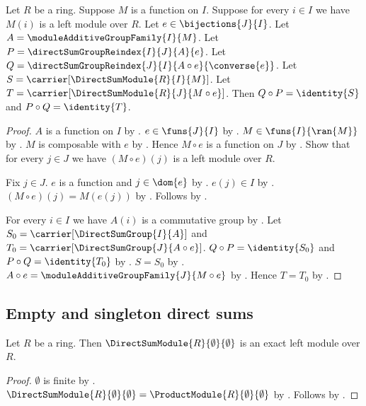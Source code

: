 \begin{theorem}\label{bijective_direct_sum_module_reindex_inverse}
    Let $R$ be a ring.
    Suppose $M$ is a function on $I$.
    Suppose for every $i\in I$ we have $M(i)$ is a left module over $R$.
    Let $e\in\bijections{J}{I}$.
    Let $A=\moduleAdditiveGroupFamily{I}{M}$.
    Let $P=\directSumGroupReindex{I}{J}{A}{e}$.
    Let $Q=\directSumGroupReindex{J}{I}{A\circ e}{\converse{e}}$.
    Let $S=\carrier[\DirectSumModule{R}{I}{M}]$.
    Let $T=\carrier[\DirectSumModule{R}{J}{M\circ e}]$.
    Then $Q\circ P=\identity{S}$ and $P\circ Q=\identity{T}$.
\end{theorem}
\begin{proof}
    $A$ is a function on $I$ by
        .
    $e\in\funs{J}{I}$ by .
    $M\in\funs{I}{\ran{M}}$ by
        .
    $M$ is composable with $e$ by .
    Hence $M\circ e$ is a function on $J$ by
        .
    Show that for every $j\in J$ we have
        $(M\circ e)(j)$ is a left module over $R$.
    \begin{subproof}
        Fix $j\in J$.
        $e$ is a function and $j\in\dom{e}$ by
            .
        $e(j)\in I$ by .
        $(M\circ e)(j)=M(e(j))$ by
            .
        Follows by \auto.
    \end{subproof}
    For every $i\in I$ we have $A(i)$ is a commutative group by
        .
    Let $S_0=\carrier[\DirectSumGroup{I}{A}]$ and
        $T_0=\carrier[\DirectSumGroup{J}{A\circ e}]$.
    $Q\circ P=\identity{S_0}$ and $P\circ Q=\identity{T_0}$ by
        .
    $S=S_0$ by .
    $A\circ e=\moduleAdditiveGroupFamily{J}{M\circ e}$ by
        .
    Hence $T=T_0$ by .
\end{proof}

\subsection{Empty and singleton direct sums}

\begin{proposition}\label{empty_direct_sum_module_is_exact}
    Let $R$ be a ring.
    Then $\DirectSumModule{R}{\emptyset}{\emptyset}$
        is an exact left module over $R$.
\end{proposition}
\begin{proof}
    $\emptyset$ is finite by .
    $\DirectSumModule{R}{\emptyset}{\emptyset}
        =\ProductModule{R}{\emptyset}{\emptyset}$ by
        .
    Follows by .
\end{proof}

